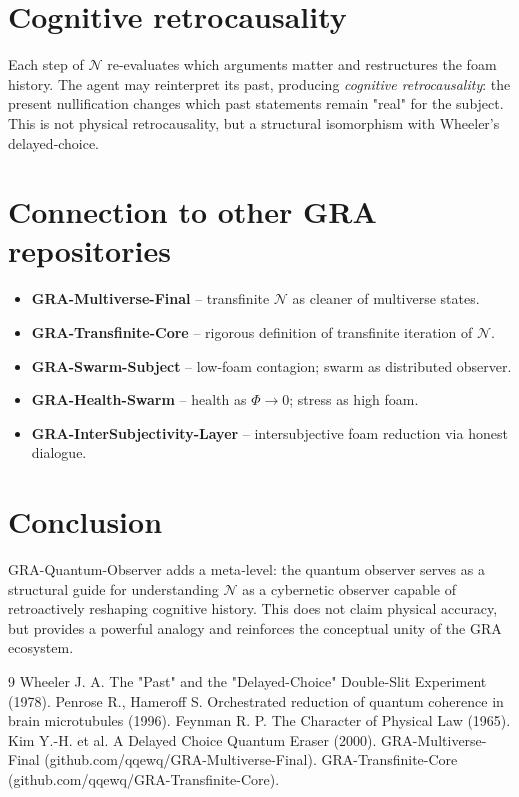 \documentclass[a4paper,12pt]{article}
\begin{document}
\section{Cognitive retrocausality}
Each step of $\mathcal{N}$ re‑evaluates which arguments matter and restructures the foam history. The agent may reinterpret its past, producing \emph{cognitive retrocausality}: the present nullification changes which past statements remain "real" for the subject. This is not physical retrocausality, but a structural isomorphism with Wheeler’s delayed‑choice.

\section{Connection to other GRA repositories}
\begin{itemize}
  \item \textbf{GRA-Multiverse-Final} – transfinite $\mathcal{N}$ as cleaner of multiverse states.
  \item \textbf{GRA-Transfinite-Core} – rigorous definition of transfinite iteration of $\mathcal{N}$.
  \item \textbf{GRA-Swarm-Subject} – low‑foam contagion; swarm as distributed observer.
  \item \textbf{GRA-Health-Swarm} – health as $\Phi \to 0$; stress as high foam.
  \item \textbf{GRA-InterSubjectivity-Layer} – intersubjective foam reduction via honest dialogue.
\end{itemize}

\section{Conclusion}
GRA-Quantum-Observer adds a meta‑level: the quantum observer serves as a structural guide for understanding $\mathcal{N}$ as a cybernetic observer capable of retroactively reshaping cognitive history. This does not claim physical accuracy, but provides a powerful analogy and reinforces the conceptual unity of the GRA ecosystem.

\begin{thebibliography}{9}
 Wheeler J. A. The "Past" and the "Delayed-Choice" Double-Slit Experiment (1978).
 Penrose R., Hameroff S. Orchestrated reduction of quantum coherence in brain microtubules (1996).
 Feynman R. P. The Character of Physical Law (1965).
 Kim Y.-H. et al. A Delayed Choice Quantum Eraser (2000).
 GRA-Multiverse-Final (github.com/qqewq/GRA-Multiverse-Final).
 GRA-Transfinite-Core (github.com/qqewq/GRA-Transfinite-Core).
\end{thebibliography}
\end{document}
